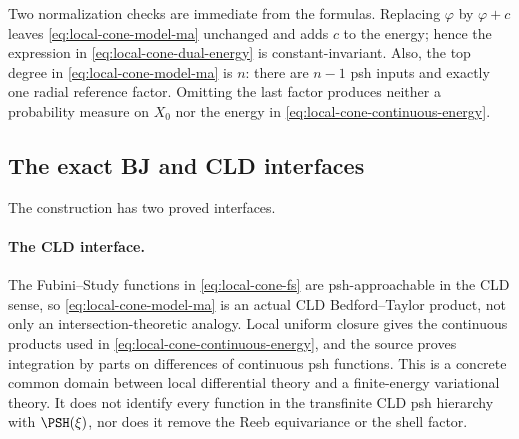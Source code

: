 Two normalization checks are immediate from the formulas.  Replacing
$\varphi$ by $\varphi+c$ leaves
\eqref{eq:local-cone-model-ma} unchanged and adds $c$ to the energy; hence
the expression in \eqref{eq:local-cone-dual-energy} is constant-invariant.
Also, the top degree in \eqref{eq:local-cone-model-ma} is $n$: there are
$n-1$ psh inputs and exactly one radial reference factor.  Omitting the
last factor produces neither a probability measure on $X_0$ nor the
energy in \eqref{eq:local-cone-continuous-energy}.

\subsection{The exact BJ and CLD interfaces}
\label{subsec:local-cone-interfaces}

The construction has two proved interfaces.

\paragraph{The CLD interface.}
The Fubini--Study functions in \eqref{eq:local-cone-fs} are
psh-approachable in the CLD sense, so
\eqref{eq:local-cone-model-ma} is an actual CLD Bedford--Taylor product, not
only an intersection-theoretic analogy.  Local uniform closure gives the
continuous products used in \eqref{eq:local-cone-continuous-energy}, and the
source proves integration by parts on differences of continuous psh
functions.  This is a concrete common domain between local differential
theory and a finite-energy variational theory.  It does not identify every
function in the transfinite CLD psh hierarchy with $\PSH(\xi)$, nor does it
remove the Reeb equivariance or the shell factor.

